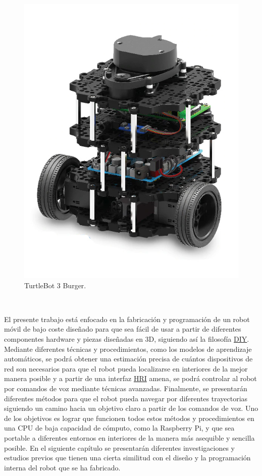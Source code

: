 \begin{figure} [H]
  \begin{center}
    \includegraphics[scale=0.25]{figs/turtlebot3burguer.jpg}
  \end{center}
  \caption{TurtleBot 3 Burger.}
  \label{fig:turtlebot}
\end{figure}\


El presente trabajo está enfocado en la fabricación y programación de un robot móvil de bajo coste diseñado para que sea fácil de usar a partir de diferentes componentes hardware y piezas diseñadas en 3D, siguiendo así la filosofía \hyperlink{DIY}{DIY}. Mediante diferentes técnicas y procedimientos, como los modelos de aprendizaje automáticos, se podrá obtener una estimación precisa de cuántos dispositivos de red son necesarios para que el robot pueda localizarse en interiores de la mejor manera posible y a partir de una interfaz \hyperlink{HRI}{HRI} amena, se podrá controlar al robot por comandos de voz mediante técnicas avanzadas. Finalmente, se presentarán diferentes métodos para que el robot pueda navegar por diferentes trayectorias siguiendo un camino hacia un objetivo claro a partir de los comandos de voz. Uno de los objetivos es lograr que funcionen todos estos métodos y procedimientos en una CPU de baja capacidad de cómputo, como la Raspberry Pi, y que sea portable a diferentes entornos en interiores de la manera más asequible y sencilla posible. En el siguiente capítulo se presentarán diferentes investigaciones y estudios previos que tienen una cierta similitud con el diseño y la programación interna del robot que se ha fabricado.

\vspace{15cm} %







